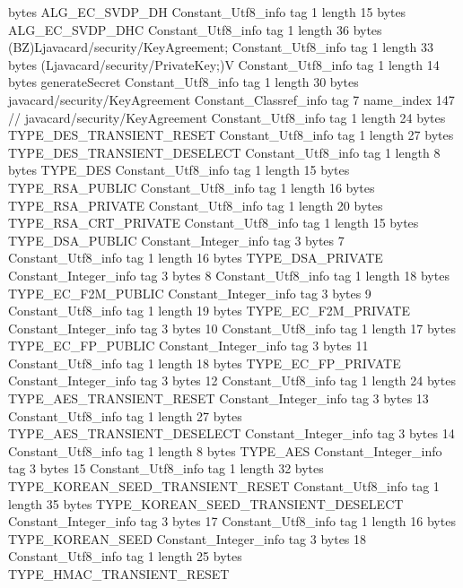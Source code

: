 {{{			bytes	ALG_EC_SVDP_DH
		}
		Constant_Utf8_info {
			tag	1
			length	15
			bytes	ALG_EC_SVDP_DHC
		}
		Constant_Utf8_info {
			tag	1
			length	36
			bytes	(BZ)Ljavacard/security/KeyAgreement;
		}
		Constant_Utf8_info {
			tag	1
			length	33
			bytes	(Ljavacard/security/PrivateKey;)V
		}
		Constant_Utf8_info {
			tag	1
			length	14
			bytes	generateSecret
		}
		Constant_Utf8_info {
			tag	1
			length	30
			bytes	javacard/security/KeyAgreement
		}
		Constant_Classref_info {
			tag	7
			name_index	147		// javacard/security/KeyAgreement
		}
		Constant_Utf8_info {
			tag	1
			length	24
			bytes	TYPE_DES_TRANSIENT_RESET
		}
		Constant_Utf8_info {
			tag	1
			length	27
			bytes	TYPE_DES_TRANSIENT_DESELECT
		}
		Constant_Utf8_info {
			tag	1
			length	8
			bytes	TYPE_DES
		}
		Constant_Utf8_info {
			tag	1
			length	15
			bytes	TYPE_RSA_PUBLIC
		}
		Constant_Utf8_info {
			tag	1
			length	16
			bytes	TYPE_RSA_PRIVATE
		}
		Constant_Utf8_info {
			tag	1
			length	20
			bytes	TYPE_RSA_CRT_PRIVATE
		}
		Constant_Utf8_info {
			tag	1
			length	15
			bytes	TYPE_DSA_PUBLIC
		}
		Constant_Integer_info {
			tag	3
			bytes	7
		}
		Constant_Utf8_info {
			tag	1
			length	16
			bytes	TYPE_DSA_PRIVATE
		}
		Constant_Integer_info {
			tag	3
			bytes	8
		}
		Constant_Utf8_info {
			tag	1
			length	18
			bytes	TYPE_EC_F2M_PUBLIC
		}
		Constant_Integer_info {
			tag	3
			bytes	9
		}
		Constant_Utf8_info {
			tag	1
			length	19
			bytes	TYPE_EC_F2M_PRIVATE
		}
		Constant_Integer_info {
			tag	3
			bytes	10
		}
		Constant_Utf8_info {
			tag	1
			length	17
			bytes	TYPE_EC_FP_PUBLIC
		}
		Constant_Integer_info {
			tag	3
			bytes	11
		}
		Constant_Utf8_info {
			tag	1
			length	18
			bytes	TYPE_EC_FP_PRIVATE
		}
		Constant_Integer_info {
			tag	3
			bytes	12
		}
		Constant_Utf8_info {
			tag	1
			length	24
			bytes	TYPE_AES_TRANSIENT_RESET
		}
		Constant_Integer_info {
			tag	3
			bytes	13
		}
		Constant_Utf8_info {
			tag	1
			length	27
			bytes	TYPE_AES_TRANSIENT_DESELECT
		}
		Constant_Integer_info {
			tag	3
			bytes	14
		}
		Constant_Utf8_info {
			tag	1
			length	8
			bytes	TYPE_AES
		}
		Constant_Integer_info {
			tag	3
			bytes	15
		}
		Constant_Utf8_info {
			tag	1
			length	32
			bytes	TYPE_KOREAN_SEED_TRANSIENT_RESET
		}
		Constant_Utf8_info {
			tag	1
			length	35
			bytes	TYPE_KOREAN_SEED_TRANSIENT_DESELECT
		}
		Constant_Integer_info {
			tag	3
			bytes	17
		}
		Constant_Utf8_info {
			tag	1
			length	16
			bytes	TYPE_KOREAN_SEED
		}
		Constant_Integer_info {
			tag	3
			bytes	18
		}
		Constant_Utf8_info {
			tag	1
			length	25
			bytes	TYPE_HMAC_TRANSIENT_RESET
		}
}}
